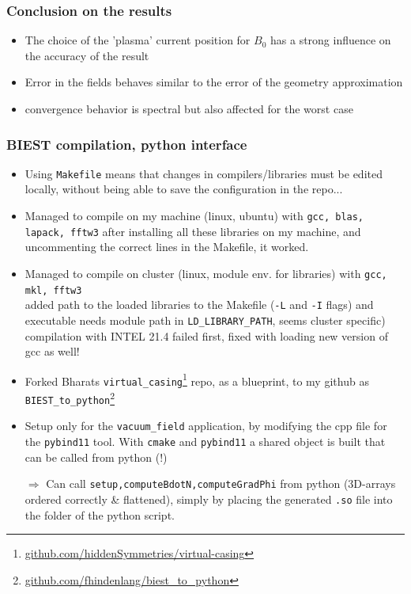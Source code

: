 \documentclass[aspectratio=169]{beamer}
\newcommand{\textc}[1]{\textcolor{iagcolor}{#1}}
\begin{document}
\begin{frame}
 \frametitle{Conclusion on the results}
 \begin{itemize}
  \item The choice of the 'plasma' current position for $B_0$ has a strong influence on the accuracy of the result
  \item Error in the fields behaves similar to the error of the geometry approximation
  \item convergence behavior is spectral but also affected for the worst case
 \end{itemize}

\end{frame}


\begin{frame}
  \frametitle{BIEST compilation, python interface} 
  \small
\begin{itemize}
  \item Using \texttt{Makefile} means that changes in compilers/libraries must be edited locally, without being able to save the configuration in the repo...
  \item Managed to compile on my machine (linux, ubuntu) with 
        \texttt{gcc, blas, lapack, fftw3} 
        after installing all these libraries on my machine, and uncommenting the correct lines in the Makefile, it worked.
  \item  Managed to compile on cluster (linux, module env. for libraries) with           \texttt{gcc, mkl, fftw3}  \\
         added path to the loaded libraries to the Makefile (\texttt{-L} and \texttt{-I} flags) and executable needs module path in \texttt{LD\_LIBRARY\_PATH}, seems cluster specific)\\
         compilation with INTEL 21.4 failed first, fixed with loading new version of gcc as well!
   \item Forked Bharats \texttt{virtual\_casing}\footnote{\tiny\url{github.com/hiddenSymmetries/virtual-casing}} repo, as a blueprint, to my github as \texttt{BIEST\_to\_python}\footnote{\tiny\url{github.com/fhindenlang/biest_to_python}}
   \item Setup only for the \textc{\texttt{vacuum\_field} application}, by modifying the cpp file for the \texttt{pybind11} tool. With \texttt{cmake} and \texttt{pybind11} a shared object is built that can be called from python (!) 
   \item[$\Rightarrow$] \textc{Can call \texttt{setup,computeBdotN,computeGradPhi} from python (3D-arrays ordered correctly \& flattened), simply by placing the generated \texttt{.so} file into the folder of the python script.}
\end{itemize}
   
\end{frame}
\end{document}
